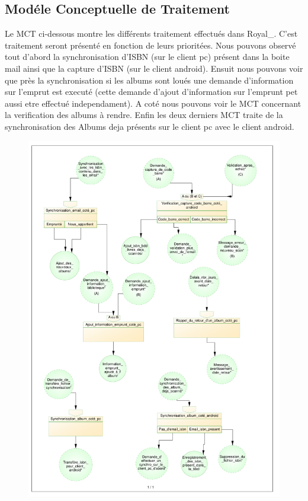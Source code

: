 \subsection{Modéle Conceptuelle de Traitement}

Le MCT ci-dessous montre les différents traitement effectués dans Royal\_. C'est traitement seront présenté en fonction de leurs prioritées.
Nous pouvons observé tout d'abord la synchronisation d'ISBN (sur le client pc) présent dans la boite mail ainsi que la capture d'ISBN (sur le client android).
Ensuit nous pouvons voir que près la synchronisation si les albums sont loués une demande d'information sur l'emprut est executé (cette demande d'ajout d'information sur l'emprunt pet aussi etre effectué independament).
A coté nous pouvons voir le MCT concernant la verification des albums à rendre.
Enfin les deux derniers MCT traite de la synchronisation des Albums deja présents sur le client pc avec le client android.

\begin{figure}
\includegraphics[width=14cm]{MCT_Royal.pdf}
\end{figure}
\clearpage{}

